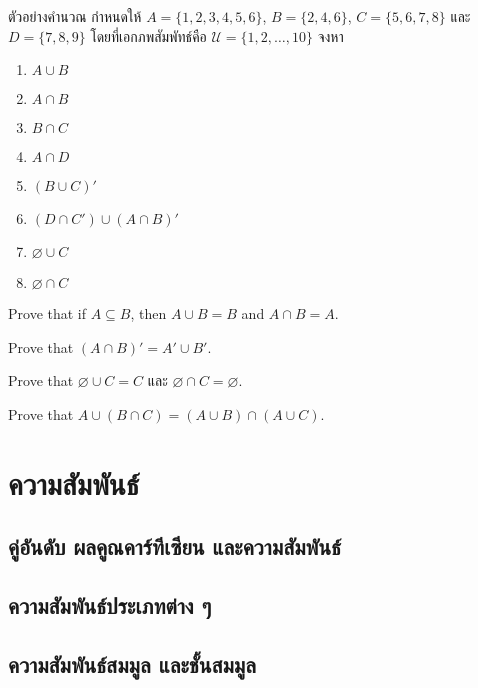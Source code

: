 \begin{exam}
	{ตัวอย่างคำนวณ}{}
	กำหนดให้ $A = \{1,2,3,4,5,6\}$, $B = \{2,4,6\}$, $C=\{5,6,7,8\}$ และ $D=\{7,8,9\}$ โดยที่เอกภพสัมพัทธ์คือ $\mathcal{U}=\{1,2,\dots,10\}$ จงหา
	\begin{enumerate}
		\item $A\cup B$
		\item $A\cap B$
		\item $B\cap C$
		\item $A\cap D$
		\item $(B\cup C)'$
		\item $(D\cap C') \cup (A\cap B)'$
		\item $\varnothing\cup C$
		\item $\varnothing\cap C$
	\end{enumerate}
\end{exam}
\newpage
\begin{exer}
	Prove that if $A\subseteq B$, then $A\cup B = B$ and $A\cap B = A$.
\end{exer}
\vspace{7.5cm}
\begin{exer}
	Prove that $(A\cap B)' = A' \cup B'$.
\end{exer}
\vspace{7cm}
\newpage
\begin{exer}
	Prove that $\varnothing\cup C = C$ และ $\varnothing\cap C=\varnothing$.
\end{exer}
\vspace{7.5cm}
\begin{exer}
	Prove that $A\cup (B \cap C) = (A\cup B) \cap (A\cup C)$.
\end{exer}
\vspace{7cm}
\newpage
\section{ความสัมพันธ์}
\subsection{คู่อันดับ ผลคูณคาร์ทีเซียน และความสัมพันธ์}
\subsection{ความสัมพันธ์ประเภทต่าง ๆ}
\subsection{ความสัมพันธ์สมมูล และชั้นสมมูล}

